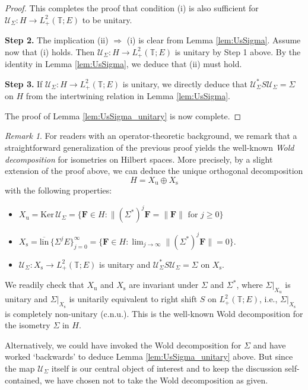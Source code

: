\documentclass[10pt,reqno,a4paper]{amsart}
\theoremstyle{definition}
\theoremstyle{remark}
\theoremstyle{remark}
\newtheorem*{remark*}{Remark}
\numberwithin{equation}{section}
\newcommand{\T}{\mathbb{T}}
\newcommand{\ov}{\overline}
\renewcommand{\ker}{\mathrm{Ker}}
\newcommand{\Xu}{X_{\mathrm{u}}}
\newcommand{\Xs}{X_{\mathrm{s}}}
\newcommand{\Fb}{\mathbf{F}}
\newcommand{\Us}{\mathscr{U}}
\begin{document}
\begin{proof}
This completes the proof that condition (i) is  also sufficient for $\Us_\Sigma : H \to L^2_+(\T;E)$ to be unitary.

\medskip
\textbf{Step 2.} The implication (ii) $\Rightarrow$ (i) is clear from Lemma \ref{lem:UsSigma}. Assume now that (i) holds. Then $\Us_\Sigma : H \to L^2_+(\T;E)$ is unitary by Step 1 above. By the identity in Lemma \ref{lem:UsSigma}, we deduce that (ii) must hold.

\medskip
\textbf{Step 3.} If $\Us_\Sigma : H \to L^2_+(\T;E)$ is unitary, we directly deduce that $\Us_\Sigma^* S \Us_\Sigma = \Sigma$ on $H$ from the intertwining relation in Lemma \ref{lem:UsSigma}.

\medskip
The proof of Lemma \ref{lem:UsSigma_unitary} is now complete.
\end{proof}

\begin{remark*}
For readers with an operator-theoretic background, we remark that a straightforward generalization of the previous proof yields the well-known {\em Wold decomposition} for isometries on Hilbert spaces. More precisely, by a slight extension of the proof above, we can deduce the unique orthogonal decomposition
$$
H = \Xu \oplus \Xs
$$
with the following properties:
\begin{itemize}
\item $\Xu = \ker \, \Us_\Sigma = \{ \Fb \in H : \mbox{$\| (\Sigma^*)^j \Fb = \| \Fb \|$ for $j \geq 0$} \}$
\item $\Xs = \ov{\mathrm{lin}} \, \{ \Sigma^j E \}_{j=0}^\infty = \{ \Fb \in H : \lim_{j \to \infty} \| (\Sigma^*)^j \Fb \| = 0 \}$.
\item $\Us_\Sigma : \Xs \to L^2_+(\T;E)$ is unitary and $\Us_\Sigma^* S \Us_\Sigma = \Sigma$ on $\Xs$. 
\end{itemize}
We readily check that $\Xu$ and $\Xs$ are invariant under $\Sigma$ and $\Sigma^*$, where $\Sigma |_{\Xu}$ is unitary and $\Sigma |_{\Xs}$ is unitarily equivalent to right shift $S$ on $L^2_+(\T;E)$, i.e., $\Sigma |_{\Xs}$ is completely non-unitary (c.n.u.). This is the well-known Wold decomposition for the isometry $\Sigma$ in $H$. 

Alternatively, we could have invoked the Wold decomposition for $\Sigma$ and have worked `backwards' to deduce Lemma \ref{lem:UsSigma_unitary} above. But since the map $\Us_\Sigma$ itself is our central object of interest and to keep the discussion self-contained, we have chosen not to take the Wold decomposition as given. \end{remark*}
\end{document}
